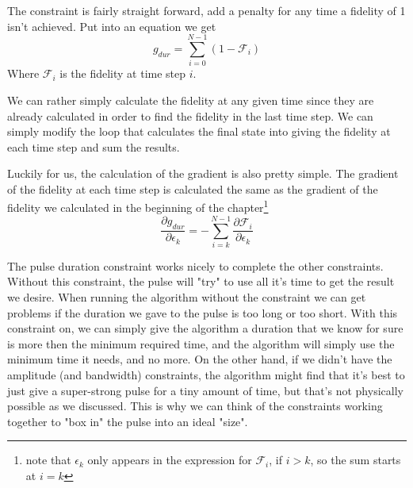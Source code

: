 
The constraint is fairly straight forward, add a penalty for any time a fidelity of 1 isn't achieved. Put into an equation we get
\[
    g_{dur} = \sum_{i = 0}^{N-1} (1 - \mathcal{F}_i)
\]
Where $\mathcal{F}_i$ is the fidelity at time step $i$.

We can rather simply calculate the fidelity at any given time since they are already calculated in order to find the fidelity in the last time step. We can simply modify the loop that calculates the final state into giving the fidelity at each time step and sum the results. 

Luckily for us, the calculation of the gradient is also pretty simple. The gradient of the fidelity at each time step is calculated the same as the gradient of the fidelity we calculated in the beginning of the chapter\footnote{note that $\epsilon_k$ only appears in the expression for $\mathcal{F}_i$, if $i > k$, so the sum starts at $i = k$}
\[
    \frac{\partial g_{dur}}{\partial \epsilon_k} = -\sum_{i = k}^{N-1}\frac{\partial \mathcal{F}_i}{\partial \epsilon_k}
\]

The pulse duration constraint works nicely to complete the other constraints. Without this constraint, the pulse will "try" to use all it's time to get the result we desire. When running the algorithm without the constraint we can get problems if the duration we gave to the pulse is too long or too short. With this constraint on, we can simply give the algorithm a duration that we know for sure is more then the minimum required time, and the algorithm will simply use the minimum time it needs, and no more. On the other hand, if we didn't have the amplitude (and bandwidth) constraints, the algorithm might find that it's best to just give a super-strong pulse for a tiny amount of time, but that's not physically possible as we discussed. This is why we can think of the constraints working together to "box in" the pulse into an ideal "size".

